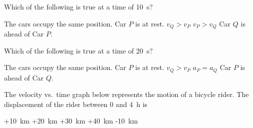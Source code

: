 \documentclass{../../../oss-ap12ibhl}
\begin{document}
\begin{questions}

  \question Which of the following is true at a time of \SI{10}{\second}?
  \begin{choices}
    \choice The cars occupy the same position.
    \choice Car $P$ is at rest.
    \choice $v_Q>v_P$
    \choice $v_P>v_Q$
    \choice Car $Q$ is ahead of Car $P$.
  \end{choices}
  \label{q:graph1}
    
  \question Which of the following is true at a time of \SI{20}{\second}?
  \begin{choices}
    \choice The cars occupy the same position.
    \choice Car $P$ is at rest.
    \choice $v_Q>v_P$
    \choice $a_P=a_Q$
    \choice Car $P$ is ahead of Car $Q$.
  \end{choices}
  \label{q:graph2}
  
  \question The velocity vs.\ time graph below represents the motion of a
  bicycle rider. The displacement of the rider between $0$ and \SI{4}{\hour} is

  \begin{minipage}{.4\linewidth}
  \end{minipage}
  \begin{minipage}{.4\linewidth}
    \begin{choices}
      \choice +\SI{10}{\kilo\metre}
      \choice +\SI{20}{\kilo\metre}
      \choice +\SI{30}{\kilo\metre}
      \choice +\SI{40}{\kilo\metre}
      \choice -\SI{10}{\kilo\metre}
    \end{choices}
  \end{minipage}
  \newpage
  

\end{questions}
\end{document}

